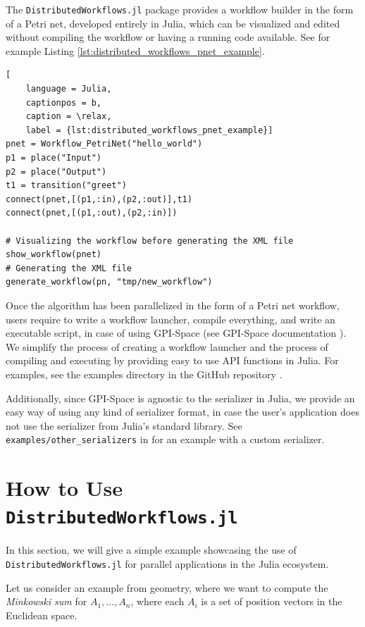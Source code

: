 \documentclass{juliacon}
\begin{document}
The \texttt{DistributedWorkflows.jl} package provides a workflow builder in the form of a Petri net, developed entirely in Julia, which can be visualized and edited without compiling the workflow or having a running code available. See for example Listing \ref{lst:distributed_workflows_pnet_example}.

\begin{lstlisting}[
    language = Julia,
    captionpos = b,
    caption = \relax,
    label = {lst:distributed_workflows_pnet_example}]
pnet = Workflow_PetriNet("hello_world")
p1 = place("Input")
p2 = place("Output")
t1 = transition("greet")
connect(pnet,[(p1,:in),(p2,:out)],t1)
connect(pnet,[(p1,:out),(p2,:in)])

# Visualizing the workflow before generating the XML file
show_workflow(pnet)
# Generating the XML file
generate_workflow(pn, "tmp/new_workflow")
\end{lstlisting}

Once the algorithm has been parallelized in the form of a Petri net workflow, users require to write a workflow launcher, compile everything, and write an executable script, in case of using GPI-Space (see GPI-Space documentation \cite{GSPC}).
We simplify the process of creating a workflow launcher and the process of compiling and executing by providing easy to use API functions in Julia.
For examples, see the examples directory in the GitHub repository \cite{DistributedWorkflows}.\vskip 6pt

Additionally, since GPI-Space is agnostic to the serializer in Julia, we provide an easy way of using any kind of serializer format, in case the user's application does not use the serializer from Julia's standard library.
See \verb+examples/other_serializers+ in \cite{DistributedWorkflows} for an example with a custom serializer.\vskip 6pt


\section{How to Use \texttt{DistributedWorkflows.jl}}
\label{sec:how_to_use}

In this section, we will give a simple example showcasing the use of \texttt{DistributedWorkflows.jl} for parallel applications in the Julia ecosystem.\vskip 6pt

Let us consider an example from geometry, where we want to compute the \emph{Minkowski sum} for $A_1, \ldots, A_n$, where each $A_i$ is a set of position vectors in the Euclidean space.\vskip 6pt
\end{document}
